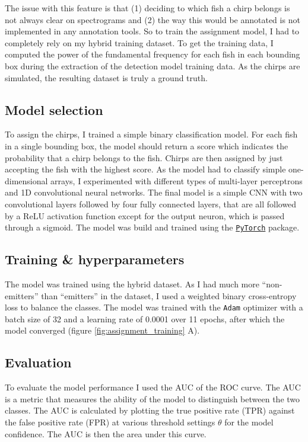 The issue with this feature is that (1) deciding to which fish a chirp belongs
is not always clear on spectrograms and (2) the way this would be annotated is
not implemented in any annotation tools. So to train the assignment model, I
had to completely rely on my hybrid training dataset. To get the training data,
I computed the power of the fundamental frequency for each fish in each
bounding box during the extraction of the detection model training data. As the
chirps are simulated, the resulting dataset is truly a ground truth.

\subsection{Model selection}

To assign the chirps, I trained a simple binary classification model. For each
fish in a single bounding box, the model should return a score which indicates
the probability that a chirp belongs to the fish. Chirps are then assigned by
just accepting the fish with the highest score. As the model had to classify
simple one-dimensional arrays, I experimented with different types of
multi-layer perceptrons and 1D convolutional neural networks. The final model
is a simple CNN with two convolutional layers followed by four fully connected
layers, that are all followed by a \acrfull{ReLU} activation function except
for the output neuron, which is passed through a sigmoid. The model was build
and trained using the \href{pytorch.org}{\texttt{PyTorch}} package.

\subsection{Training \& hyperparameters}

The model was trained using the hybrid dataset. As I had much more
\enquote{non-emitters} than \enquote{emitters} in the dataset, I used a
weighted binary cross-entropy loss to balance the classes. The model was
trained with the \texttt{Adam} optimizer with a batch size of 32 and a learning
rate of 0.0001 over  11 epochs, after which the model converged (figure
\ref{fig:assignment_training} A).

\subsection{Evaluation}

To evaluate the model performance I used the \acrfull{AUC} of the \acrfull{ROC}
curve. The AUC is a metric that measures the ability of the model to
distinguish between the two classes. The AUC is calculated by plotting the
true positive rate (TPR) against the false positive rate (FPR) at various
threshold settings $\theta$ for the model confidence. The AUC is then the area
under this curve.

